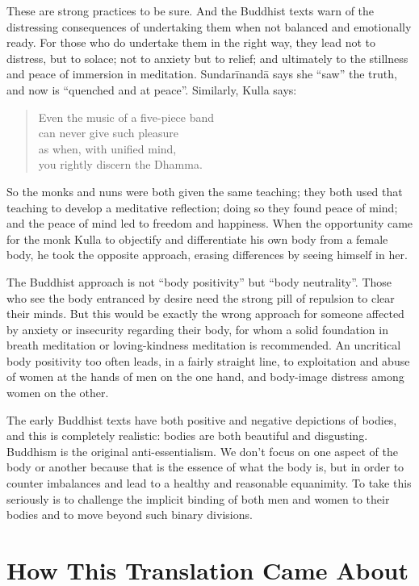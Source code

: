 \documentclass[12pt,openany]{book}%
\begin{document}
These are strong practices to be sure. And the Buddhist texts warn of the distressing consequences of undertaking them when not balanced and emotionally ready. For those who do undertake them in the right way, they lead not to distress, but to solace; not to anxiety but to relief; and ultimately to the stillness and peace of immersion in meditation. \textsanskrit{Sundarīnandā} says she “saw” the truth, and now is “quenched and at peace”. Similarly, Kulla says:

\begin{quotation}%
Even the music of a five-piece band \\
can never give such pleasure \\
as when, with unified mind, \\
you rightly discern the Dhamma.

%
\end{quotation}

So the monks and nuns were both given the same teaching; they both used that teaching to develop a meditative reflection; doing so they found peace of mind; and the peace of mind led to freedom and happiness. When the opportunity came for the monk Kulla to objectify and differentiate his own body from a female body, he took the opposite approach, erasing differences by seeing himself in her.

The Buddhist approach is not “body positivity” but “body neutrality”. Those who see the body entranced by desire need the strong pill of repulsion to clear their minds. But this would be exactly the wrong approach for someone affected by anxiety or insecurity regarding their body, for whom a solid foundation in breath meditation or loving-kindness meditation is recommended. An uncritical body positivity too often leads, in a fairly straight line, to exploitation and abuse of women at the hands of men on the one hand, and body-image distress among women on the other.  

The early Buddhist texts have both positive and negative depictions of bodies, and this is completely realistic: bodies are both beautiful and disgusting. Buddhism is the original anti-essentialism. We don’t focus on one aspect of the body or another because that is the essence of what the body is, but in order to counter imbalances and lead to a healthy and reasonable equanimity. To take this seriously is to challenge the implicit  binding of both men and women to their bodies and to move beyond such binary divisions. 

\section*{How This Translation Came About}
\end{document}
